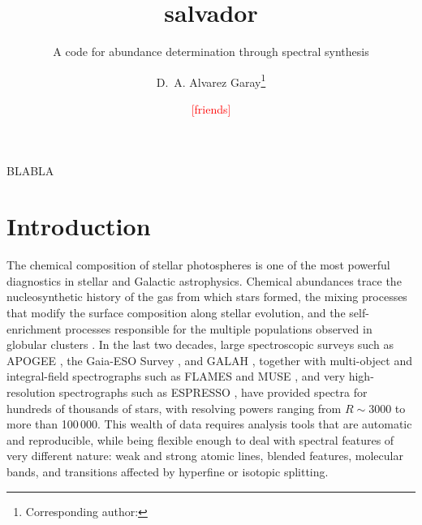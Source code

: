\documentclass{aa}
\newcommand{\todo}[1]{\textcolor{red}{[#1]}}
\begin{document}
\title{salvador}
\subtitle{A code for abundance determination through spectral synthesis}

\author{D.~A. Alvarez Garay\fnmsep\thanks{Corresponding author:
        }
   \and \todo{friends}
       }



\abstract
{BLABLA}

\maketitle

\section{Introduction}
\label{sec:intro}

The chemical composition of stellar photospheres is one of the most
powerful diagnostics in stellar and Galactic astrophysics. Chemical
abundances trace the nucleosynthetic history of the gas from which
stars formed, the mixing processes that modify the surface
composition along stellar evolution, and the self-enrichment
processes responsible for the multiple populations observed in
globular clusters \citep[GCs; e.g.,][]{Bastian2018, Gratton2019}. In
the last two decades, large spectroscopic surveys such as APOGEE
\citep{Majewski2017}, the Gaia-ESO Survey \citep{Gilmore2022}, and
GALAH \citep{Buder2021}, together with multi-object and integral-field
spectrographs such as FLAMES \citep{Pasquini2002} and MUSE
\citep{Bacon2010}, and very high-resolution spectrographs such as
ESPRESSO \citep{Pepe2021}, have provided spectra for hundreds of
thousands of stars, with resolving powers ranging from
$R\sim3000$ to more than 100\,000. This wealth of data requires
analysis tools that are automatic and reproducible, while being
flexible enough to deal with spectral features of very different
nature: weak and strong atomic lines, blended features, molecular
bands, and transitions affected by hyperfine or isotopic splitting.
\end{document}
